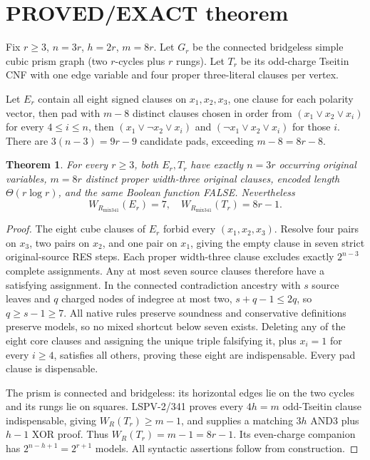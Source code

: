 \documentclass{article}
\newtheorem{theorem}{Theorem}
\begin{document}
\section*{PROVED/EXACT theorem}
Fix $r\ge3$, $n=3r$, $h=2r$, $m=8r$. Let $G_r$ be the connected bridgeless simple cubic prism graph (two $r$-cycles plus $r$ rungs). Let $T_r$ be its odd-charge Tseitin CNF with one edge variable and four proper three-literal clauses per vertex.

Let $E_r$ contain all eight signed clauses on $x_1,x_2,x_3$, one clause for each polarity vector, then pad with $m-8$ distinct clauses chosen in order from $(x_1\vee x_2\vee x_i)$ for every $4\le i\le n$, then $(x_1\vee\neg x_2\vee x_i)$ and $(\neg x_1\vee x_2\vee x_i)$ for those $i$. There are $3(n-3)=9r-9$ candidate pads, exceeding $m-8=8r-8$.

\begin{theorem}
For every $r\ge3$, both $E_r,T_r$ have exactly $n=3r$ occurring original variables, $m=8r$ distinct proper width-three original clauses, encoded length $\Theta(r\log r)$, and the same Boolean function FALSE. Nevertheless
\[
\boxed{W_{R_{\mathrm{mix341}}}(E_r)=7,\quad W_{R_{\mathrm{mix341}}}(T_r)=8r-1.}
\]
\end{theorem}
\begin{proof}
The eight cube clauses of $E_r$ forbid every $(x_1,x_2,x_3)$. Resolve four pairs on $x_3$, two pairs on $x_2$, and one pair on $x_1$, giving the empty clause in seven strict original-source RES steps. Each proper width-three clause excludes exactly $2^{n-3}$ complete assignments. Any at most seven source clauses therefore have a satisfying assignment. In the connected contradiction ancestry with $s$ source leaves and $q$ charged nodes of indegree at most two, $s+q-1\le 2q$, so $q\ge s-1\ge7$. All native rules preserve soundness and conservative definitions preserve models, so no mixed shortcut below seven exists. Deleting any of the eight core clauses and assigning the unique triple falsifying it, plus $x_i=1$ for every $i\ge4$, satisfies all others, proving these eight are indispensable. Every pad clause is dispensable.

The prism is connected and bridgeless: its horizontal edges lie on the two cycles and its rungs lie on squares. LSPV-2/341 proves every $4h=m$ odd-Tseitin clause indispensable, giving $W_R(T_r)\ge m-1$, and supplies a matching $3h$ AND3 plus $h-1$ XOR proof. Thus $W_R(T_r)=m-1=8r-1$. Its even-charge companion has $2^{n-h+1}=2^{r+1}$ models. All syntactic assertions follow from construction.
\end{proof}
\end{document}
